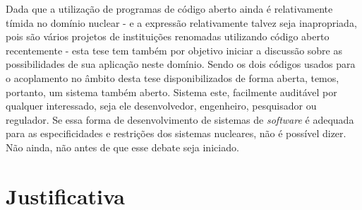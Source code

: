 Dada que a utilização de programas de código aberto ainda é relativamente tímida no domínio nuclear
- e a expressão relativamente talvez seja inapropriada, pois são vários projetos de instituições
renomadas utilizando código aberto recentemente \cite{Romano2013, Boyd2014, Huff2016} -
esta tese tem também por objetivo iniciar a discussão sobre as possibilidades de sua
aplicação neste domínio. Sendo os dois códigos usados para o acoplamento no âmbito desta tese disponibilizados
de forma aberta, temos, portanto, um sistema também aberto. Sistema este, facilmente auditável
por qualquer interessado, seja ele desenvolvedor, engenheiro, pesquisador ou regulador.
Se essa forma de desenvolvimento de sistemas de \textit{software} é adequada para as especificidades
e restrições dos sistemas nucleares, não é possível dizer. Não ainda, não antes de que esse debate
seja iniciado.

%

\section{Justificativa}


